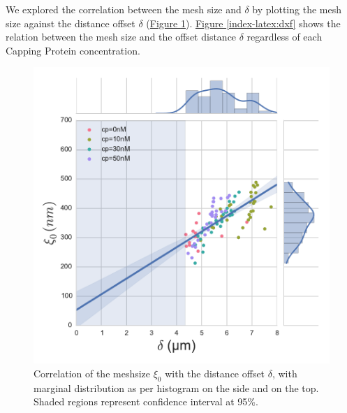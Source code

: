 \documentclass[A4paperpaper,11pt,english]{sphinxmanual}
\begin{document}
We explored the correlation between the mesh size and \(\delta\) by plotting  the mesh size against the distance offset \(\delta\) (\hyperref[index-latex:dxcf]{Figure  \ref*{index-latex:dxcf}}).
\hyperref[index-latex:dxf]{Figure  \ref*{index-latex:dxf}} shows the relation between the mesh size and the offset
distance \(\delta\) regardless of each Capping Protein concentration.
\begin{figure}[htbp]
\centering
\capstart

\includegraphics[width=1.000\linewidth]{delta-xi-corr.pdf}
\caption{Correlation of the meshsize \(\xi_0\) with the distance offset \(\delta\),
with marginal distribution as per histogram on the side and on the top.  Shaded
regions represent confidence interval at 95\%.}\label{index-latex:dxcf}\end{figure}
\end{document}
